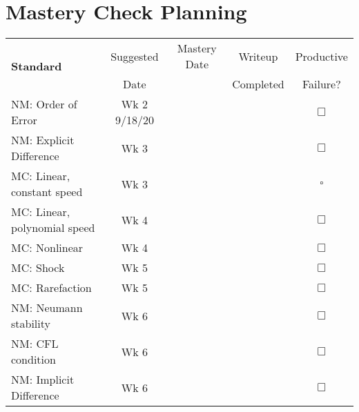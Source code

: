 \documentclass{article}
\newcommand{\checked}{\makebox[0pt][l]{$\checkmark$}$\square$}
\newcommand{\unchecked}{$\Box$}
\begin{document}
\section{Mastery Check Planning}
\begin{tabular}{|l|c|c|c|c} \cline{1-4}
\multirow{2}{5cm}{\textbf{Standard}} & Suggested & Mastery Date & Writeup & Productive  \\ 
& Date & & Completed & Failure? \\ \cline{1-4}
\multirow{2}{5cm}{NM: Order of Error} & \multirow{2}{1.5cm}{Wk 2 9/18/20} &&& \multirow{2}{.4cm}{\unchecked} \\ &&&& \\ \cline{1-4}
\multirow{2}{5cm}{NM: Explicit Difference} & \multirow{2}{1.5cm}{Wk 3} &&& \multirow{2}{.4cm}{\unchecked} \\ &&&& \\ \cline{1-4}
\multirow{2}{5cm}{MC: Linear, constant speed}  & \multirow{2}{1.5cm}{Wk 3}&&& \multirow{2}{.4cm}{\checked} \\ &&&& \\ \cline{1-4}
\multirow{2}{5cm}{MC: Linear, polynomial speed} & \multirow{2}{1.5cm}{Wk 4}&&& \multirow{2}{.4cm}{\unchecked} \\ &&&& \\ \cline{1-4}
\multirow{2}{5cm}{MC: Nonlinear} &\multirow{2}{1.5cm}{Wk 4}&&& \multirow{2}{.4cm}{\unchecked} \\ &&&& \\ \cline{1-4}
\multirow{2}{5cm}{MC: Shock} &\multirow{2}{1.5cm}{Wk 5}&&& \multirow{2}{.4cm}{\unchecked} \\ &&&& \\ \cline{1-4}
\multirow{2}{5cm}{MC: Rarefaction} & \multirow{2}{1.5cm}{Wk 5}&&& \multirow{2}{.4cm}{\unchecked} \\ &&&& \\ \cline{1-4}
\multirow{2}{5cm}{NM: Neumann stability} &\multirow{2}{1.5cm}{Wk 6}&&& \multirow{2}{.4cm}{\unchecked} \\ &&&& \\ \cline{1-4}
\multirow{2}{5cm}{NM: CFL condition} &\multirow{2}{1.5cm}{Wk 6}&&& \multirow{2}{.4cm}{\unchecked} \\ &&&& \\ \cline{1-4}
\multirow{2}{5cm}{NM: Implicit Difference} &\multirow{2}{1.5cm}{Wk 6}&&& \multirow{2}{.4cm}{\unchecked} \\ &&&& \\ \cline{1-4}

\end{tabular}
\end{document}

